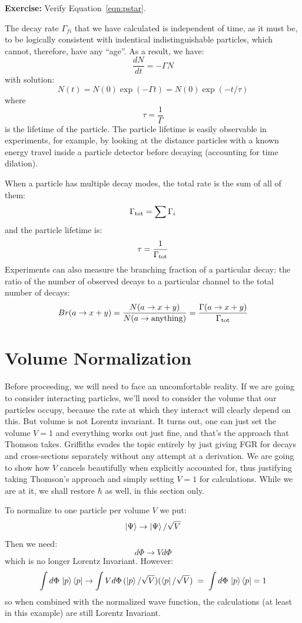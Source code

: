 \documentclass[12pt]{article}
\begin{document}
\noindent
{\bf Exercise:} Verify Equation~\ref{eqn:pstar}.

The decay rate $\Gamma_{fi}$ that we have calculated is independent of
time, as it must be, to be logically consistent with indentical
indistinguishable particles, which cannot, therefore, have any
``age''.  As a result, we have:
$$\frac{dN}{dt} = - \Gamma N$$
with solution:
$$N(t) = N(0) \exp(-\Gamma t) = N(0) \exp(-t /\tau)  $$
where
$$\tau = \frac{1}{\Gamma}$$
is the lifetime of the particle.  The particle lifetime is easily
observable in experiments, for example, by looking at the distance
particles with a known energy travel inside a particle detector before
decaying (accounting for time dilation).

When a particle has multiple decay modes, the total rate is the sum of
all of them:
$$\Gamma_{\rm tot} = \sum \Gamma_i $$
and the particle lifetime is:
$$\tau = \frac{1}{\Gamma_{\rm tot}}$$
Experiments can also measure the branching fraction of a particular
decay: the ratio of the number of observed decays to a particular channel to the total number of decays:
$$Br(a \to x+y) = \frac{N(a \to x+y)}{N(a \to {\rm anything})} = \frac{\Gamma(a \to x+y)}{\Gamma_{\rm tot}}$$

\section{Volume Normalization}
\label{sec:volume-normalization}

Before proceeding, we will need to face an uncomfortable reality.  If
we are going to consider interacting particles, we'll need to consider
the volume that our particles occupy, because the rate at which they
interact will clearly depend on this.  But volume is not Lorentz
invariant.  It turns out, one can just set the volume $V=1$ and
everything works out just fine, and that's the approach that Thomson
takes.  Griffiths evades the topic entirely by just giving FGR for
decays and cross-sections separately without any attempt at a
derivation.  We are going to show how $V$ cancels beautifully when
explicitly accounted for, thus justifying taking Thomson's approach
and simply setting $V=1$ for calculations.  While we are at it, we
shall restore $\hbar$ as well, in this section only.

To normalize to one particle per volume $V$ we put:
$$\ket{\Psi} \to \ket{\Psi}/\sqrt{V}$$
Then we need:
$$d\Phi \to V d\Phi$$
which is no longer Lorentz Invariant.  However:
\begin{equation*}
 \int d\Phi \, \ket{p}\bra{p}
 \to \int V d\Phi \, (\ket{p}/\sqrt{V})(\bra{p}/\sqrt{V})
  \; = \; \int d\Phi \, \ket{p}\bra{p} = 1
\end{equation*}
so when combined with the normalized wave function, the calculations
(at least in this example) are still Lorentz Invariant.
\end{document}
